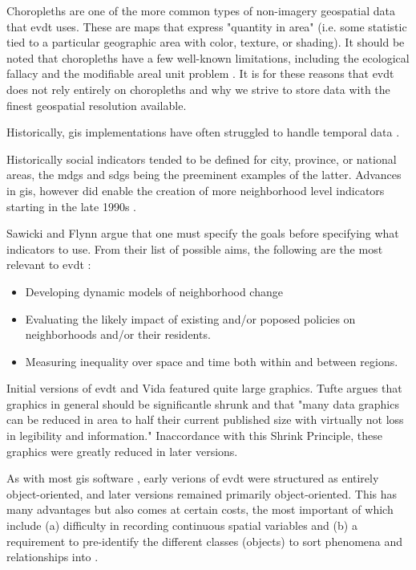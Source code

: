 Choropleths are one of the more common types of non-imagery geospatial data that \ac{evdt} uses. These are maps that express "quantity in area" (i.e. some statistic tied to a particular geographic area with color, texture, or shading). It should be noted that choropleths have a few well-known limitations, including the ecological fallacy and the modifiable areal unit problem \cite{cramptonRethinkingMapsIdentity2011, sawickiNeighborhoodIndicatorsReview1996}. It is for these reasons that \ac{evdt} does not rely entirely on choropleths and why we strive to store data with the finest geospatial resolution available.

Historically, \ac{gis} implementations have often struggled to handle temporal data \cite{harrisLocationalModelsGeographic1993}.

Historically social indicators tended to be defined for city, province, or national areas, the \acp{mdg} and \acp{sdg} being the preeminent examples of the latter. Advances in \ac{gis}, however did enable the creation of more neighborhood level indicators starting in the late 1990s \cite{sawickiNeighborhoodIndicatorsReview1996}. 

Sawicki and Flynn argue that one must specify the goals before specifying what indicators to use. From their list of possible aims, the following are the most relevant to \ac{evdt} \cite{sawickiNeighborhoodIndicatorsReview1996}:

\begin{itemize}[itemsep=0pt,parsep=0pt]
	\item{Developing dynamic models of neighborhood change}
	\item{Evaluating the likely impact of existing and/or poposed policies on neighborhoods and/or their residents.}
	\item{Measuring inequality over space and time both within and between regions.}
\end{itemize}



Initial versions of \ac{evdt} and Vida featured quite large graphics. Tufte argues that graphics in general should be significantle shrunk and that "many data graphics can be reduced in area to half their current published size with virtually not loss in legibility and information." \cite{tufteVisualDisplayQuantitative2001} Inaccordance with this Shrink Principle, these graphics were greatly reduced in later versions.

As with most \ac{gis} software \cite{heikkilaGISDeadLong1998}, early verions of \ac{evdt} were structured as entirely object-oriented, and later versions remained primarily object-oriented. This has many advantages but also comes at certain costs, the most important of which include (a) difficulty in recording continuous spatial variables and (b) a requirement to pre-identify the different classes (objects) to sort phenomena and relationships into \cite{goodchildModelingEarth2011}. 


